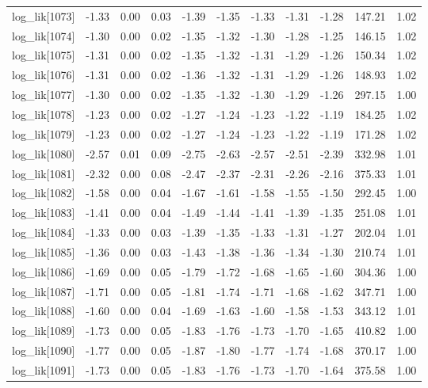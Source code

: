 \begin{table}[ht]
\begin{tabular}{rrrrrrrrrrr}
  log\_lik[1073] & -1.33 & 0.00 & 0.03 & -1.39 & -1.35 & -1.33 & -1.31 & -1.28 & 147.21 & 1.02 \\ 
  log\_lik[1074] & -1.30 & 0.00 & 0.02 & -1.35 & -1.32 & -1.30 & -1.28 & -1.25 & 146.15 & 1.02 \\ 
  log\_lik[1075] & -1.31 & 0.00 & 0.02 & -1.35 & -1.32 & -1.31 & -1.29 & -1.26 & 150.34 & 1.02 \\ 
  log\_lik[1076] & -1.31 & 0.00 & 0.02 & -1.36 & -1.32 & -1.31 & -1.29 & -1.26 & 148.93 & 1.02 \\ 
  log\_lik[1077] & -1.30 & 0.00 & 0.02 & -1.35 & -1.32 & -1.30 & -1.29 & -1.26 & 297.15 & 1.00 \\ 
  log\_lik[1078] & -1.23 & 0.00 & 0.02 & -1.27 & -1.24 & -1.23 & -1.22 & -1.19 & 184.25 & 1.02 \\ 
  log\_lik[1079] & -1.23 & 0.00 & 0.02 & -1.27 & -1.24 & -1.23 & -1.22 & -1.19 & 171.28 & 1.02 \\ 
  log\_lik[1080] & -2.57 & 0.01 & 0.09 & -2.75 & -2.63 & -2.57 & -2.51 & -2.39 & 332.98 & 1.01 \\ 
  log\_lik[1081] & -2.32 & 0.00 & 0.08 & -2.47 & -2.37 & -2.31 & -2.26 & -2.16 & 375.33 & 1.01 \\ 
  log\_lik[1082] & -1.58 & 0.00 & 0.04 & -1.67 & -1.61 & -1.58 & -1.55 & -1.50 & 292.45 & 1.00 \\ 
  log\_lik[1083] & -1.41 & 0.00 & 0.04 & -1.49 & -1.44 & -1.41 & -1.39 & -1.35 & 251.08 & 1.01 \\ 
  log\_lik[1084] & -1.33 & 0.00 & 0.03 & -1.39 & -1.35 & -1.33 & -1.31 & -1.27 & 202.04 & 1.01 \\ 
  log\_lik[1085] & -1.36 & 0.00 & 0.03 & -1.43 & -1.38 & -1.36 & -1.34 & -1.30 & 210.74 & 1.01 \\ 
  log\_lik[1086] & -1.69 & 0.00 & 0.05 & -1.79 & -1.72 & -1.68 & -1.65 & -1.60 & 304.36 & 1.00 \\ 
  log\_lik[1087] & -1.71 & 0.00 & 0.05 & -1.81 & -1.74 & -1.71 & -1.68 & -1.62 & 347.71 & 1.00 \\ 
  log\_lik[1088] & -1.60 & 0.00 & 0.04 & -1.69 & -1.63 & -1.60 & -1.58 & -1.53 & 343.12 & 1.01 \\ 
  log\_lik[1089] & -1.73 & 0.00 & 0.05 & -1.83 & -1.76 & -1.73 & -1.70 & -1.65 & 410.82 & 1.00 \\ 
  log\_lik[1090] & -1.77 & 0.00 & 0.05 & -1.87 & -1.80 & -1.77 & -1.74 & -1.68 & 370.17 & 1.00 \\ 
  log\_lik[1091] & -1.73 & 0.00 & 0.05 & -1.83 & -1.76 & -1.73 & -1.70 & -1.64 & 375.58 & 1.00 \\ 

\end{tabular}
\end{table}

